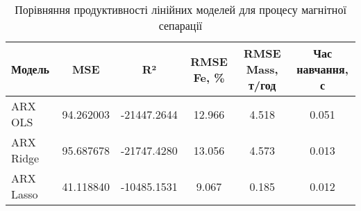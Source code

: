 \begin{table}[h]
\centering
\caption{Порівняння продуктивності лінійних моделей для процесу магнітної сепарації}
\label{tab:linear_models_comparison}
\begin{tabular}{|l|c|c|c|c|c|}
\hline
\textbf{Модель} & \textbf{MSE} & \textbf{R²} & \textbf{RMSE Fe, \%} & \textbf{RMSE Mass, т/год} & \textbf{Час навчання, с} \\
\hline
ARX OLS & 94.262003 & -21447.2644 & 12.966 & 4.518 & 0.051 \\
\hline
ARX Ridge & 95.687678 & -21747.4280 & 13.056 & 4.573 & 0.013 \\
\hline
ARX Lasso & 41.118840 & -10485.1531 & 9.067 & 0.185 & 0.012 \\
\hline
\end{tabular}
\end{table}